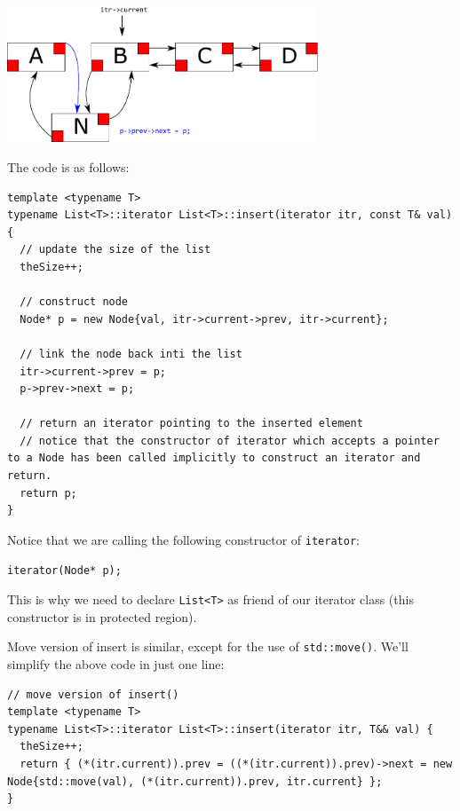 \documentclass[12pt]{book}
\begin{document}
\begin{center}
\includegraphics[width=350px]{./img/List-insert-3.pdf}
\end{center}

The code is as follows:
\begin{verbatim}
template <typename T>
typename List<T>::iterator List<T>::insert(iterator itr, const T& val) {
  // update the size of the list
  theSize++; 

  // construct node
  Node* p = new Node{val, itr->current->prev, itr->current};

  // link the node back inti the list
  itr->current->prev = p;
  p->prev->next = p;

  // return an iterator pointing to the inserted element
  // notice that the constructor of iterator which accepts a pointer to a Node has been called implicitly to construct an iterator and return.
  return p;
}
\end{verbatim}

Notice that we are calling the following constructor of \texttt{iterator}:
\begin{verbatim}
iterator(Node* p);
\end{verbatim}

This is why we need to declare \texttt{List<T>} as friend of our iterator class (this constructor is in protected region).

Move version of insert is similar, except for the use of \texttt{std::move()}. We'll simplify the above code in just one line:
\begin{verbatim}
// move version of insert()
template <typename T>
typename List<T>::iterator List<T>::insert(iterator itr, T&& val) {
  theSize++;
  return { (*(itr.current)).prev = ((*(itr.current)).prev)->next = new Node{std::move(val), (*(itr.current)).prev, itr.current} };
}
\end{verbatim}
\end{document}
